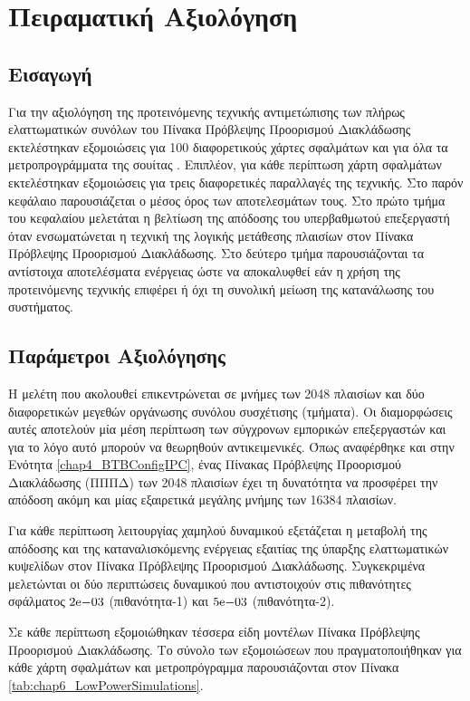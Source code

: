 \chapter{Πειραματική Αξιολόγηση}
\label{chap6}

\section{Εισαγωγή}
\label{chap6_Intro}

Για την αξιολόγηση της προτεινόμενης τεχνικής αντιμετώπισης των πλήρως ελαττωματικών συνόλων του Πίνακα Πρόβλεψης Προορισμού Διακλάδωσης εκτελέστηκαν εξομοιώσεις για 100 διαφορετικούς χάρτες σφαλμάτων και για όλα τα μετροπρογράμματα της σουίτας \spec. Επιπλέον, για κάθε περίπτωση χάρτη σφαλμάτων εκτελέστηκαν εξομοιώσεις για τρεις διαφορετικές παραλλαγές της τεχνικής. Στο παρόν κεφάλαιο παρουσιάζεται ο μέσος όρος των αποτελεσμάτων τους. Στο πρώτο τμήμα του κεφαλαίου μελετάται η βελτίωση της απόδοσης του υπερβαθμωτού επεξεργαστή όταν ενσωματώνεται η τεχνική της λογικής μετάθεσης πλαισίων στον Πίνακα Πρόβλεψης Προορισμού Διακλάδωσης. Στο δεύτερο τμήμα παρουσιάζονται τα αντίστοιχα αποτελέσματα ενέργειας ώστε να αποκαλυφθεί εάν η χρήση της προτεινόμενης τεχνικής επιφέρει ή όχι τη συνολική μείωση της κατανάλωσης του συστήματος.


\section{Παράμετροι Αξιολόγησης}
\label{chap6_EvaluationParameters}

Η μελέτη που ακολουθεί επικεντρώνεται σε μνήμες των 2048 πλαισίων και δύο διαφορετικών μεγεθών οργάνωσης συνόλου συσχέτισης (τμήματα). Οι διαμορφώσεις αυτές αποτελούν μία μέση περίπτωση των σύγχρονων εμπορικών επεξεργαστών και για το λόγο αυτό μπορούν να θεωρηθούν αντικειμενικές. Όπως αναφέρθηκε και στην Ενότητα \ref{chap4_BTBConfigIPC}, ένας Πίνακας Πρόβλεψης Προορισμού Διακλάδωσης (ΠΠΠΔ) των 2048 πλαισίων έχει τη δυνατότητα να προσφέρει την απόδοση ακόμη και μίας εξαιρετικά μεγάλης μνήμης των 16384 πλαισίων.
\par
Για κάθε περίπτωση λειτουργίας χαμηλού δυναμικού εξετάζεται η μεταβολή της απόδοσης και της καταναλισκόμενης ενέργειας εξαιτίας της ύπαρξης ελαττωματικών κυψελίδων στον Πίνακα Πρόβλεψης Προορισμού Διακλάδωσης. Συγκεκριμένα μελετώνται οι δύο περιπτώσεις δυναμικού που αντιστοιχούν στις πιθανότητες σφάλματος $2\mathrm{e}{-03}$ (πιθανότητα-1) και $5\mathrm{e}{-03}$ (πιθανότητα-2).
\par
Σε κάθε περίπτωση εξομοιώθηκαν τέσσερα είδη μοντέλων Πίνακα Πρόβλεψης Προορισμού Διακλάδωσης. Το σύνολο των εξομοιώσεων που πραγματοποιήθηκαν για κάθε χάρτη σφαλμάτων και μετροπρόγραμμα παρουσιάζονται στον Πίνακα \ref{tab:chap6_LowPowerSimulations}.

